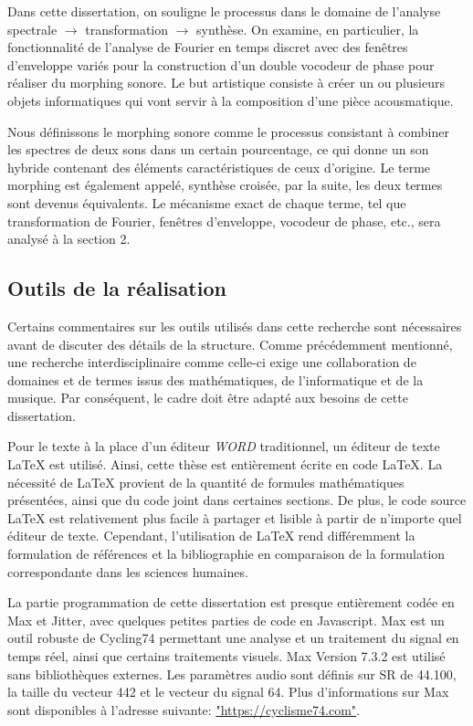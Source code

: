 Dans cette dissertation, on souligne le processus dans le domaine de l'analyse spectrale $\to$ transformation $\to$ synthèse. On examine, en particulier, la fonctionnalité de l'analyse de Fourier en temps discret avec des fenêtres d'enveloppe variés pour la construction d'un double vocodeur de phase pour réaliser du morphing sonore. Le but artistique consiste à créer un ou plusieurs objets informatiques qui vont servir à la composition d'une pièce acousmatique.

Nous définissons le morphing sonore comme le processus consistant à combiner les spectres de deux sons dans un certain pourcentage, ce qui donne un son hybride contenant des éléments caractéristiques de ceux d'origine. Le terme morphing est également appelé, synthèse croisée, par la suite, les deux termes sont devenus équivalents. Le mécanisme exact de chaque terme, tel que transformation de Fourier, fenêtres d’enveloppe, vocodeur de phase, etc., sera analysé à la section 2.

\subsection{Outils de la réalisation}

Certains commentaires sur les outils utilisés dans cette recherche sont nécessaires avant de discuter des détails de la structure. Comme précédemment mentionné, une recherche interdisciplinaire comme celle-ci exige une collaboration de domaines et de termes issus des mathématiques, de l'informatique et de la musique. Par conséquent, le cadre doit être adapté aux besoins de cette dissertation.

Pour le texte à la place d'un éditeur \textit{WORD} traditionnel, un éditeur de texte \LaTeX{} est utilisé. Ainsi, cette thèse est entièrement écrite en code \LaTeX{}. La nécessité de \LaTeX{} provient de la quantité de formules mathématiques présentées, ainsi que du code joint dans certaines sections. De plus, le code source \LaTeX{} est relativement plus facile à partager et lisible à partir de n’importe quel éditeur de texte. Cependant, l’utilisation de \LaTeX{} rend différemment la formulation de références et la bibliographie en comparaison de la formulation correspondante dans les sciences humaines.

La partie programmation de cette dissertation est presque entièrement codée en Max et Jitter, avec quelques petites parties de code en Javascript. Max est un outil robuste de Cycling74 permettant une analyse et un traitement du signal en temps réel, ainsi que certains traitements visuels. Max Version 7.3.2 est utilisé sans bibliothèques externes. Les paramètres audio sont définis sur SR de 44.100, la taille du vecteur 442 et le vecteur du signal 64. Plus d’informations sur Max sont disponibles à l’adresse suivante: \href{https://cycling74.com/products/max/}{"https://cyclisme74.com"}.

